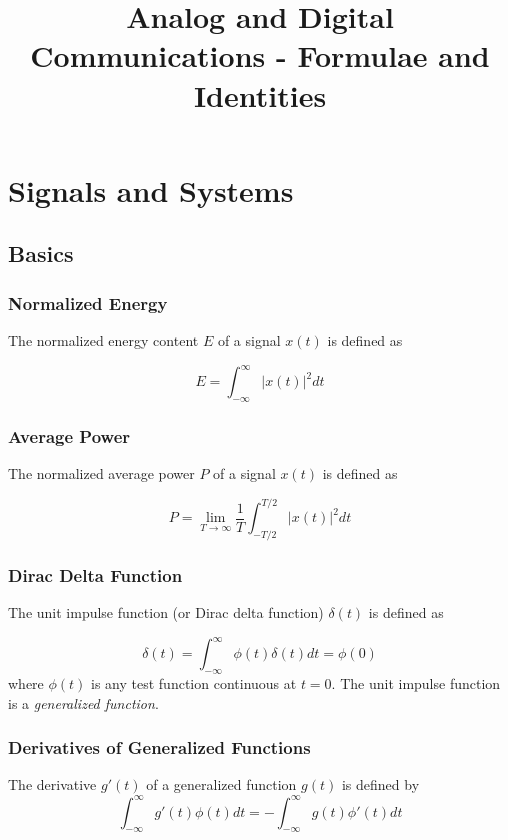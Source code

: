 \documentclass[]{article}
\title{Analog and Digital Communications - Formulae and Identities}
\begin{document}
\maketitle

\tableofcontents
\newpage

\section{Signals and Systems}
\begin{multicols}{2}
	
\subsection{Basics}
\subsubsection{Normalized Energy}
The normalized energy content $E$ of a signal $x(t)$ is defined as

\begin{equation} E = \int_{-\infty}^{\infty} |x(t)|^{2}dt \label{norm_energy} \end{equation}

\subsubsection{Average Power}
The normalized average power $P$ of a signal $x(t)$ is defined as

\begin{equation} P = \lim_{T \to \infty} \frac{1}{T} \int_{-T/2}^{T/2} |x(t)|^{2} dt\label{norm_power}\end{equation} 

\subsubsection{Dirac Delta Function}
The unit impulse function (or Dirac delta function) $\delta (t)$ is defined as

\begin{equation}\delta (t) = \int_{-\infty}^{\infty} \phi(t) \delta (t)dt = \phi(0)\label{dirac_def}\end{equation}
where $\phi (t) $ is any test function continuous at $t=0$. The unit impulse function is a \textit{generalized function}.

\subsubsection{Derivatives of Generalized Functions}
The derivative $g'(t)$ of a generalized function $g(t)$ is defined by
\begin{equation}\int_{-\infty}^{\infty} g'(t) \phi(t) dt = - \int_{-\infty}^{\infty} g(t) \phi '(t)dt\label{gen_func_def} \end{equation}


\end{multicols}
\end{document}

